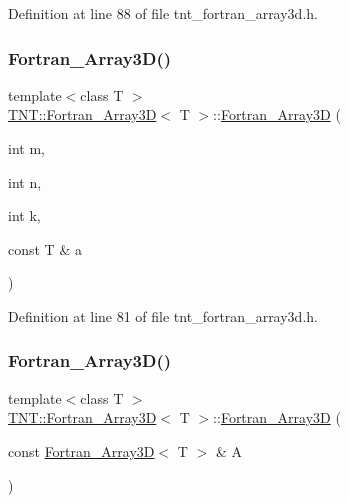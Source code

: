 Definition at line 88 of file tnt\+\_\+fortran\+\_\+array3d.\+h.

\mbox{\label{classTNT_1_1Fortran__Array3D_af2ef9c1ce37546da4f2e63ec2ac33537}} 
\subsubsection{\texorpdfstring{Fortran\+\_\+\+Array3\+D()}{Fortran\_Array3D()}\hspace{0.1cm}{\footnotesize\ttfamily [4/5]}}
{\footnotesize\ttfamily template$<$class T $>$ \\
\hyperlink{classTNT_1_1Fortran__Array3D}{T\+N\+T\+::\+Fortran\+\_\+\+Array3D}$<$ T $>$\+::\hyperlink{classTNT_1_1Fortran__Array3D}{Fortran\+\_\+\+Array3D} (\begin{DoxyParamCaption}\item[{int}]{m,  }\item[{int}]{n,  }\item[{int}]{k,  }\item[{const T \&}]{a }\end{DoxyParamCaption})}



Definition at line 81 of file tnt\+\_\+fortran\+\_\+array3d.\+h.

\mbox{\label{classTNT_1_1Fortran__Array3D_a80a98d39df23c4b3a59c7952387c07c8}} 
\subsubsection{\texorpdfstring{Fortran\+\_\+\+Array3\+D()}{Fortran\_Array3D()}\hspace{0.1cm}{\footnotesize\ttfamily [5/5]}}
{\footnotesize\ttfamily template$<$class T $>$ \\
\hyperlink{classTNT_1_1Fortran__Array3D}{T\+N\+T\+::\+Fortran\+\_\+\+Array3D}$<$ T $>$\+::\hyperlink{classTNT_1_1Fortran__Array3D}{Fortran\+\_\+\+Array3D} (\begin{DoxyParamCaption}\item[{const \hyperlink{classTNT_1_1Fortran__Array3D}{Fortran\+\_\+\+Array3D}$<$ T $>$ \&}]{A }\end{DoxyParamCaption})\hspace{0.3cm}{\ttfamily [inline]}}



